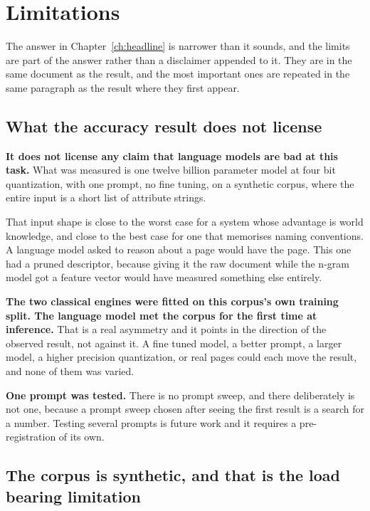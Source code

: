 \chapter{Limitations}
\label{ch:limitations}

The answer in Chapter~\ref{ch:headline} is narrower than it sounds, and the
limits are part of the answer rather than a disclaimer appended to it. They are
in the same document as the result, and the most important ones are repeated in
the same paragraph as the result where they first appear.

\section{What the accuracy result does not license}

\textbf{It does not license any claim that language models are bad at this
task.} What was measured is one twelve billion parameter model at four bit
quantization, with one prompt, no fine tuning, on a synthetic corpus, where the
entire input is a short list of attribute strings.

That input shape is close to the worst case for a system whose advantage is world
knowledge, and close to the best case for one that memorises naming conventions.
A language model asked to reason about a page would have the page. This one had a
pruned descriptor, because giving it the raw document while the n-gram model got
a feature vector would have measured something else entirely.

\textbf{The two classical engines were fitted on this corpus's own training
split. The language model met the corpus for the first time at inference.} That
is a real asymmetry and it points in the direction of the observed result, not
against it. A fine tuned model, a better prompt, a larger model, a higher
precision quantization, or real pages could each move the result, and none of
them was varied.

\textbf{One prompt was tested.} There is no prompt sweep, and there deliberately
is not one, because a prompt sweep chosen after seeing the first result is a
search for a number. Testing several prompts is future work and it requires a
pre-registration of its own.

\section{The corpus is synthetic, and that is the load bearing limitation}

